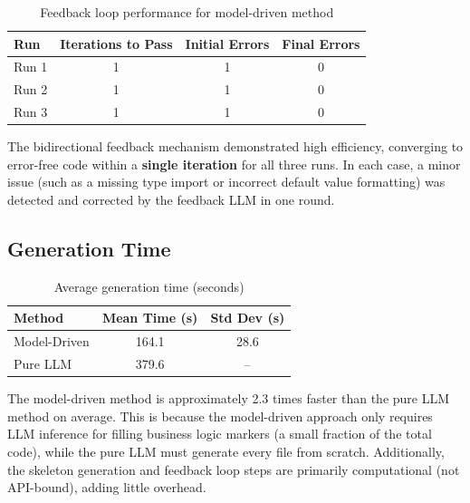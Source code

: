 \documentclass[11pt,a4paper]{article}
\begin{document}
\begin{table}[H]
\centering
\caption{Feedback loop performance for model-driven method}
\label{tab:feedback}
\begin{tabular}{lccc}
\toprule
\textbf{Run} & \textbf{Iterations to Pass} & \textbf{Initial Errors} & \textbf{Final Errors} \\
\midrule
Run 1 & 1 & 1 & 0 \\
Run 2 & 1 & 1 & 0 \\
Run 3 & 1 & 1 & 0 \\
\bottomrule
\end{tabular}
\end{table}

The bidirectional feedback mechanism demonstrated high efficiency, converging to error-free code within a \textbf{single iteration} for all three runs. In each case, a minor issue (such as a missing type import or incorrect default value formatting) was detected and corrected by the feedback LLM in one round.

\subsection{Generation Time}

\begin{table}[H]
\centering
\caption{Average generation time (seconds)}
\label{tab:time}
\begin{tabular}{lcc}
\toprule
\textbf{Method} & \textbf{Mean Time (s)} & \textbf{Std Dev (s)} \\
\midrule
Model-Driven & 164.1 & 28.6 \\
Pure LLM     & 379.6 & -- \\
\bottomrule
\end{tabular}
\end{table}

The model-driven method is approximately 2.3 times faster than the pure LLM method on average. This is because the model-driven approach only requires LLM inference for filling business logic markers (a small fraction of the total code), while the pure LLM must generate every file from scratch. Additionally, the skeleton generation and feedback loop steps are primarily computational (not API-bound), adding little overhead.

\end{document}
